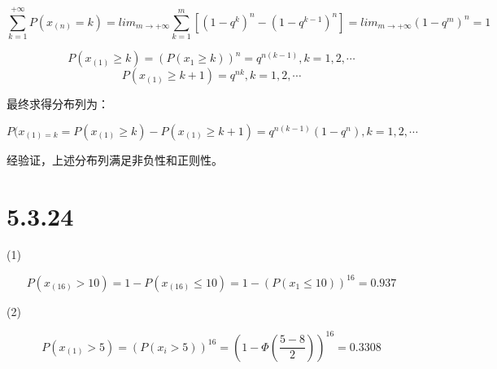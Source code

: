 \documentclass{article}
\begin{document}
$$\sum^{+\infty}_{k=1}P(x_{(n)}=k)=lim_{m\rightarrow +\infty}\sum^m_{k=1}[(1-q^k)^n-(1-q^{k-1})^n]=lim_{m\rightarrow +\infty}(1-q^m)^n=1$$


$$P(x_{(1)}\geq k)=(P(x_1\geq k))^n=q^{n(k-1)}, k=1,2,\cdots$$
$$P(x_{(1)}\geq k+1)=q^{nk}, k=1,2,\cdots$$

最终求得分布列为：

$$P(x_{(1)=k}=P(x_{(1)}\geq k)-P(x_{(1)}\geq k+1)=q^{n(k-1)}(1-q^n), k=1,2,\cdots$$

经验证，上述分布列满足非负性和正则性。

\section{5.3.24}
(1)

$$P(x_{(16)}>10)=1-P(x_{(16)}\leq10)=1-(P(x_1\leq 10))^{16}=0.937$$

(2)

$$P(x_{(1)}>5)=(P(x_i>5))^{16}=(1-\Phi(\frac{5-8}2))^{16}=0.3308$$
\end{document}
